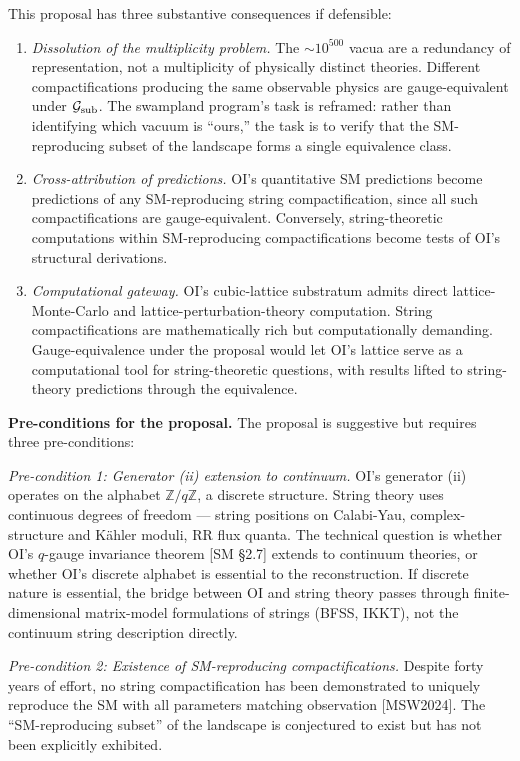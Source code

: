 \documentclass[
]{article}
\begin{document}
This proposal has three substantive consequences if defensible:

\begin{enumerate}
\def\labelenumi{(\Alph{enumi})}
\item
  \emph{Dissolution of the multiplicity problem.} The \(\sim 10^{500}\)
  vacua are a redundancy of representation, not a multiplicity of
  physically distinct theories. Different compactifications producing
  the same observable physics are gauge-equivalent under
  \(\mathcal{G}_{\rm sub}\). The swampland program's task is reframed:
  rather than identifying which vacuum is ``ours,'' the task is to
  verify that the SM-reproducing subset of the landscape forms a single
  equivalence class.
\item
  \emph{Cross-attribution of predictions.} OI's quantitative SM
  predictions become predictions of any SM-reproducing string
  compactification, since all such compactifications are
  gauge-equivalent. Conversely, string-theoretic computations within
  SM-reproducing compactifications become tests of OI's structural
  derivations.
\item
  \emph{Computational gateway.} OI's cubic-lattice substratum admits
  direct lattice-Monte-Carlo and lattice-perturbation-theory
  computation. String compactifications are mathematically rich but
  computationally demanding. Gauge-equivalence under the proposal would
  let OI's lattice serve as a computational tool for string-theoretic
  questions, with results lifted to string-theory predictions through
  the equivalence.
\end{enumerate}

\textbf{Pre-conditions for the proposal.} The proposal is suggestive but
requires three pre-conditions:

\emph{Pre-condition 1: Generator (ii) extension to continuum.} OI's
generator (ii) operates on the alphabet \(\mathbb{Z}/q\mathbb{Z}\), a
discrete structure. String theory uses continuous degrees of freedom ---
string positions on Calabi-Yau, complex-structure and Kähler moduli, RR
flux quanta. The technical question is whether OI's \(q\)-gauge
invariance theorem {[}SM §2.7{]} extends to continuum theories, or
whether OI's discrete alphabet is essential to the reconstruction. If
discrete nature is essential, the bridge between OI and string theory
passes through finite-dimensional matrix-model formulations of strings
(BFSS, IKKT), not the continuum string description directly.

\emph{Pre-condition 2: Existence of SM-reproducing compactifications.}
Despite forty years of effort, no string compactification has been
demonstrated to uniquely reproduce the SM with all parameters matching
observation {[}MSW2024{]}. The ``SM-reproducing subset'' of the
landscape is conjectured to exist but has not been explicitly exhibited.
\end{document}
